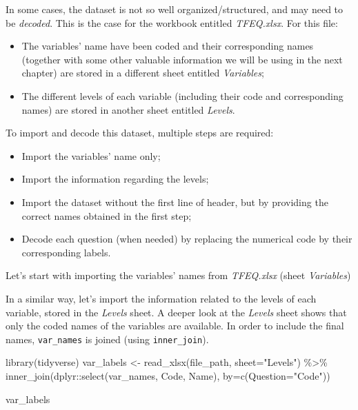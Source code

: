 \documentclass[
]{book}
\newenvironment{Shaded}{\begin{snugshade}}{\end{snugshade}}
\newcommand{\AttributeTok}[1]{\textcolor[rgb]{0.77,0.63,0.00}{#1}}
\newcommand{\FunctionTok}[1]{\textcolor[rgb]{0.00,0.00,0.00}{#1}}
\newcommand{\NormalTok}[1]{#1}
\newcommand{\OtherTok}[1]{\textcolor[rgb]{0.56,0.35,0.01}{#1}}
\newcommand{\SpecialCharTok}[1]{\textcolor[rgb]{0.00,0.00,0.00}{#1}}
\newcommand{\StringTok}[1]{\textcolor[rgb]{0.31,0.60,0.02}{#1}}
\providecommand{\tightlist}{%
  \setlength{\itemsep}{0pt}\setlength{\parskip}{0pt}}
\begin{document}
In some cases, the dataset is not so well organized/structured, and may need to be \emph{decoded}. This is the case for the workbook entitled \emph{TFEQ.xlsx}. For this file:

\begin{itemize}
\tightlist
\item
  The variables' name have been coded and their corresponding names (together with some other valuable information we will be using in the next chapter) are stored in a different sheet entitled \emph{Variables};
\item
  The different levels of each variable (including their code and corresponding names) are stored in another sheet entitled \emph{Levels}.
\end{itemize}

To import and decode this dataset, multiple steps are required:

\begin{itemize}
\tightlist
\item
  Import the variables' name only;
\item
  Import the information regarding the levels;
\item
  Import the dataset without the first line of header, but by providing the correct names obtained in the first step;
\item
  Decode each question (when needed) by replacing the numerical code by their corresponding labels.
\end{itemize}

Let's start with importing the variables' names from \emph{TFEQ.xlsx} (sheet \emph{Variables})

In a similar way, let's import the information related to the levels of each variable, stored in the \emph{Levels} sheet.
A deeper look at the \emph{Levels} sheet shows that only the coded names of the variables are available. In order to include the final names, \texttt{var\_names} is joined (using \texttt{inner\_join}).

\begin{Shaded}
\begin{Highlighting}[]
\FunctionTok{library}\NormalTok{(tidyverse)}
\NormalTok{var\_labels }\OtherTok{\textless{}{-}} \FunctionTok{read\_xlsx}\NormalTok{(file\_path, }\AttributeTok{sheet=}\StringTok{"Levels"}\NormalTok{) }\SpecialCharTok{\%\textgreater{}\%} 
  \FunctionTok{inner\_join}\NormalTok{(dplyr}\SpecialCharTok{::}\FunctionTok{select}\NormalTok{(var\_names, Code, Name), }\AttributeTok{by=}\FunctionTok{c}\NormalTok{(}\AttributeTok{Question=}\StringTok{"Code"}\NormalTok{))}

\NormalTok{var\_labels}
\end{Highlighting}
\end{Shaded}
\end{document}
